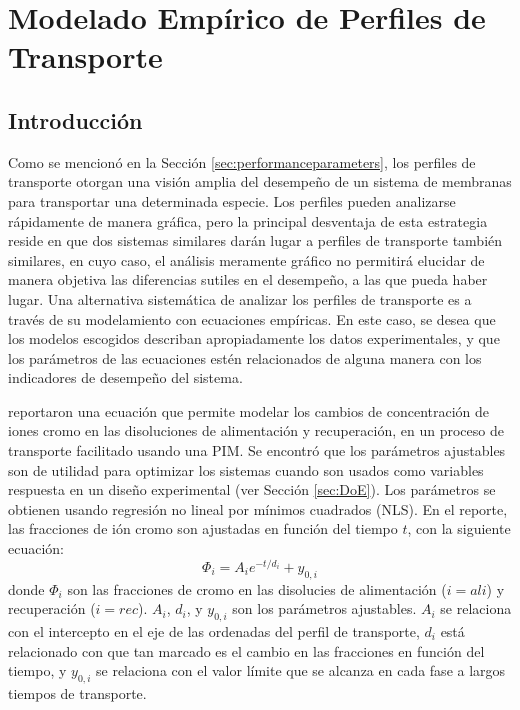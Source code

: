\chapter{Modelado Empírico de Perfiles de Transporte}\label{sec:NLS}
\section{Introducción}
Como se mencionó en la Sección \ref{sec:performanceparameters}, los perfiles de transporte otorgan una visión amplia del desempeño de un sistema de membranas para transportar una determinada especie. Los perfiles pueden analizarse rápidamente de manera gráfica, pero la principal desventaja de esta estrategia reside en que dos sistemas similares darán lugar a perfiles de transporte también similares, en cuyo caso, el análisis meramente gráfico no permitirá elucidar de manera objetiva las diferencias sutiles en el desempeño, a las que pueda haber lugar. Una alternativa sistemática de analizar los perfiles de transporte es a través de su modelamiento con ecuaciones empíricas. En este caso, se desea que los modelos escogidos describan apropiadamente los datos experimentales, y que los parámetros de las ecuaciones estén relacionados de alguna manera con los indicadores de desempeño del sistema. 


\citet{RODRIGUEZDESANMIGUEL2014} reportaron una ecuación que permite modelar los cambios de concentración de iones cromo en las disoluciones de alimentación y recuperación, en un proceso de transporte facilitado usando una PIM. Se encontró que los parámetros ajustables son de utilidad para optimizar los sistemas cuando son usados como variables respuesta en un diseño experimental (ver Sección \ref{sec:DoE}). Los parámetros se obtienen usando regresión no lineal por mínimos cuadrados (NLS). En el reporte, las fracciones de ión cromo son ajustadas en función del tiempo $t$, con la siguiente ecuación:
\begin{equation}
    \Phi_i = A_ie^{-t/d_i} + y_{0,i}
\end{equation}
donde $\Phi_i$ son las fracciones de cromo en las disolucies de alimentación ($i = ali$) y recuperación ($i = rec$). $A_i$, $d_i$, y $y_{0,i}$ son los parámetros ajustables. $A_i$ se relaciona con el intercepto en el eje de las ordenadas del perfil de transporte, $d_i$ está relacionado con que tan marcado es el cambio en las fracciones en función del tiempo, y $y_{0,i}$ se relaciona con el valor límite que se alcanza en cada fase a largos tiempos de transporte.

